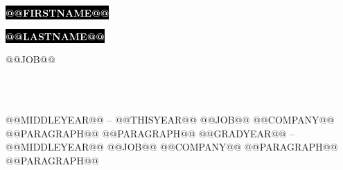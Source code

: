 \documentclass[9pt]{developercv} %
\begin{document}

\begin{minipage}[t]{0.6\textwidth} %
	\vspace{-\baselineskip} %
	
	\colorbox{black}{{\HUGE\textcolor{white}{\textbf{\MakeUppercase{@@FIRSTNAME@@}}}}} %
	
	\colorbox{black}{{\HUGE\textcolor{white}{\textbf{\MakeUppercase{@@LASTNAME@@}}}}} %
	
	\vspace{6pt}
	
	{\huge @@JOB@@} %
\end{minipage}
\begin{minipage}[t]{0.4\textwidth} %
	\vspace{-\baselineskip} %
	\raggedleft
	 \linebreak
	 \\
	 \\	
\end{minipage}

\vspace{0.5cm}



\begin{entrylist}
	\entry
		{@@MIDDLEYEAR@@ -- @@THISYEAR@@}
		{@@JOB@@}
		{@@COMPANY@@}
		{@@PARAGRAPH@@ @@PARAGRAPH@@}
	\entry
		{@@GRADYEAR@@ -- @@MIDDLEYEAR@@}
		{@@JOB@@}
		{@@COMPANY@@}
		{@@PARAGRAPH@@ @@PARAGRAPH@@}
\end{entrylist}
\end{document}
